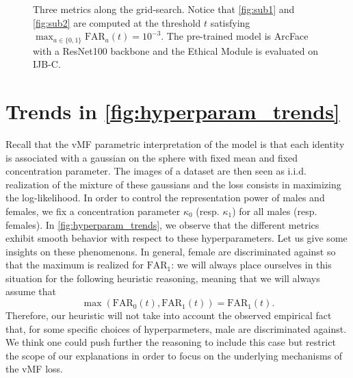 \documentclass[nohyperref]{article}
\theoremstyle{plain}
\theoremstyle{definition}
\theoremstyle{remark}
\begin{document}
\begin{figure}[ht!]
    \centering
\caption{Three metrics along the grid-search. Notice that \ref{fig:sub1} and \ref{fig:sub2} are computed at the threshold $t$ satisfying $\max_{a \in \{0, 1\}} \mathrm{FAR}_a(t) = 10^{-3}$. The pre-trained model is ArcFace with a ResNet100 backbone and the Ethical Module is evaluated on IJB-C.}
\label{fig:grid_search}
\end{figure}

























\section{Trends in \autoref{fig:hyperparam_trends}}\label{app:explain_trends_grid_search}

Recall that the vMF parametric interpretation of the model is that each identity is associated with a gaussian on the sphere with fixed mean and fixed concentration parameter. The images of a dataset are then seen as i.i.d. realization of the mixture of these gaussians and the loss consists in maximizing the log-likelihood. In order to control the representation power of males and females, we fix a concentration parameter $\kappa_0$ (resp. $\kappa_1$) for all males (resp. females). In \autoref{fig:hyperparam_trends}, we observe that the different metrics exhibit smooth behavior with respect to these hyperparameters. Let us give some insights on these phenomenons. In general, female are discriminated against so that the maximum is realized for $\mathrm{FAR_1}$: we will always place ourselves in this situation for the following heuristic reasoning, meaning that we will always assume that
\begin{equation} \label{eq:assump_heuristic}
\max ( \mathrm{FAR}_0(t), \mathrm{FAR}_1(t)  ) = \mathrm{FAR}_1(t). 
\end{equation}
Therefore, our heuristic will not take into account the observed empirical fact that, for some specific choices of hyperparmeters, male are discriminated against. We think one could push further the reasoning to include this case but restrict the scope of our explanations in order to focus on the underlying mechanisms of the vMF loss.
\end{document}
